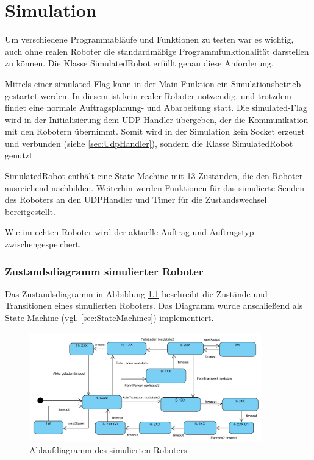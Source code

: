 
\chapter{Simulation}
\label{sec:Simulation}

Um verschiedene Programmabläufe und Funktionen zu testen war es wichtig, auch ohne realen Roboter die standardmäßige Programmfunktionalität darstellen zu können. Die Klasse SimulatedRobot erfüllt genau diese Anforderung. 

Mittels einer simulated-Flag kann in der Main-Funktion ein Simulationsbetrieb gestartet werden. In diesem ist kein realer Roboter notwendig, und trotzdem findet eine normale Auftragsplanung- und Abarbeitung statt. Die simulated-Flag wird in der Initialisierung dem UDP-Handler übergeben, der die Kommunikation mit den Robotern übernimmt. Somit wird in der Simulation kein Socket erzeugt und verbunden (siehe \ref{sec:UdpHandler}), sondern die Klasse SimulatedRobot genutzt. 

SimulatedRobot enthält eine State-Machine mit 13 Zuständen, die den Roboter ausreichend nachbilden. Weiterhin werden Funktionen für das simulierte Senden des Roboters an den UDPHandler und Timer für die Zustandswechsel bereitgestellt. 

Wie im echten Roboter wird der aktuelle Auftrag und Auftragstyp zwischengespeichert. 

\subsection{Zustandsdiagramm simulierter Roboter}

Das Zustandsdiagramm in Abbildung \ref{fig:simRobot} beschreibt die Zustände und Transitionen eines simulierten Roboters. Das Diagramm wurde anschließend als State Machine (vgl. \ref{sec:StateMachines}) implementiert. 

\begin{figure}[htb]
    \centering
    \includegraphics[width=0.9\textwidth]{Abbildungen/SimulatedRobot.PNG}
    \caption{Ablaufdiagramm des simulierten Roboters}		
    \label{fig:simRobot}
\end{figure}

